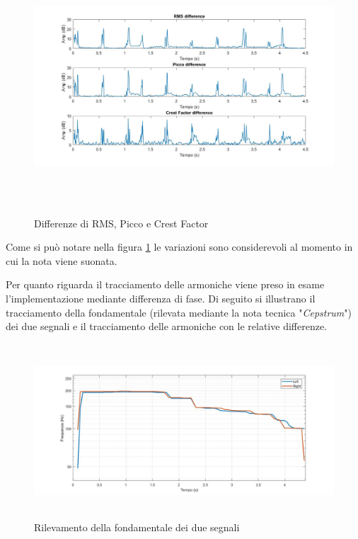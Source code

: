 \documentclass[12pt]{report}
\begin{document}
\begin{figure}[htbp]
\centerline{\includegraphics[height=95mm]{img/diff_wave}}
\caption{Differenze di RMS, Picco e Crest Factor}
\label{fig:diff_wave}
\end{figure}

Come si può notare nella figura \ref{fig:diff_wave} le variazioni sono considerevoli al momento in cui la nota viene suonata.

\clearpage

Per quanto riguarda il tracciamento delle armoniche viene preso in esame l'implementazione mediante differenza di fase.
Di seguito si illustrano il tracciamento della fondamentale (rilevata mediante la nota tecnica "{\itshape Cepstrum}") dei due segnali e il tracciamento delle armoniche con le relative differenze.

\begin{figure}[htbp]
\centerline{\includegraphics[height=65mm]{img/fond}}
\caption{Rilevamento della fondamentale dei due segnali}
\label{fig:fond}
\end{figure}
\end{document}
